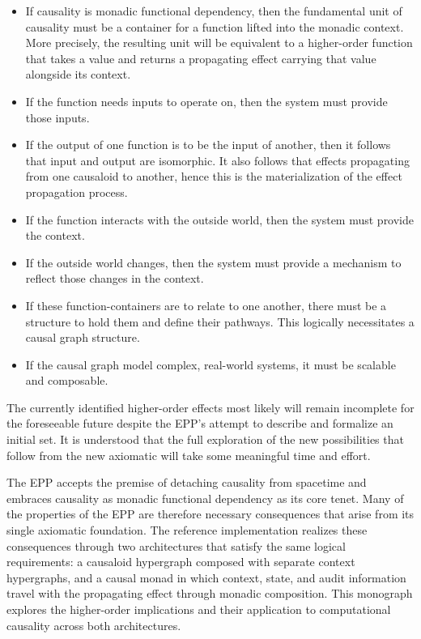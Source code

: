 \begin{itemize}
	\item If causality is monadic functional dependency, then the fundamental unit of causality must be a container for a function lifted into the monadic context. More precisely, the resulting unit will be equivalent to a higher-order function that takes a value and returns a propagating effect carrying that value alongside its context.
	\item If the function needs inputs to operate on, then the system must provide those inputs.  
	\item If the output of one function is to be the input of another, then it follows that input and output are isomorphic. It also follows that effects propagating from one causaloid to another, hence this is the materialization of the effect propagation process. 
	\item If the function interacts with the outside world, then the system must provide the context. 
	\item If the outside world changes, then the system must provide a mechanism to reflect those changes in the context. 
	\item If these function-containers are to relate to one another, there must be a structure to hold them and define their pathways. This logically necessitates a causal graph structure.
	\item If the causal graph model complex, real-world systems, it must be scalable and composable. 
\end{itemize}

The currently identified higher-order effects most likely will remain incomplete for the foreseeable future despite the EPP's attempt to describe and formalize an initial set. It is understood that the full exploration of the new possibilities that follow from the new axiomatic will take some meaningful time and effort. 

The EPP accepts the premise of detaching causality from spacetime and embraces causality as monadic functional dependency as its core tenet. Many of the properties of the EPP are therefore necessary consequences that arise from its single axiomatic foundation. The reference implementation realizes these consequences through two architectures that satisfy the same logical requirements: a causaloid hypergraph composed with separate context hypergraphs, and a causal monad in which context, state, and audit information travel with the propagating effect through monadic composition. This monograph explores the higher-order implications and their application to computational causality across both architectures.
% 
%
